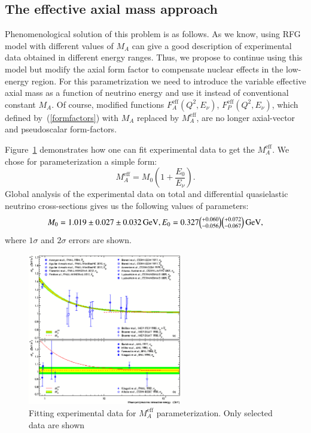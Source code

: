 \subsection{The effective axial mass approach}
Phenomenological solution of this problem is as follows. As we know, using RFG model with different values of $M_{A}$ can give a good description of experimental data obtained in different energy ranges. Thus, we propose to continue using this model but modify the axial form factor to compensate nuclear effects in the low-energy region. For this parametrization we need to introduce the variable effective axial mass as a function of neutrino energy and use it instead of conventional constant $M_{A}$. Of course, modified functions $F_{A}^\mathrm{eff}(Q^{2},E_{\nu})$, $F_{P}^\mathrm{eff}(Q^{2},E_{\nu})$, which defined by~(\ref{formfactors}) with $M_{A}$ replaced by $M_{A}^\mathrm{eff}$, are no longer axial-vector and pseudoscalar form-factors.

Figure~\ref{MA_QES_eff} demonstrates how one can fit experimental data to get the $M_{A}^\mathrm{eff}$. We chose for parameterization a simple form:
\begin{equation}
M_{A}^\mathrm{eff}=M_{0}\left(1+\frac{E_{0}}{E_{\nu}}\right).
\end{equation}
Global analysis of the experimental data on total and differential quasielastic neutrino cross-sections gives us the following values of parameters:
\begin{equation}
M_{0}=1.019\pm0.027\pm0.032\,\mathrm{GeV},E_{0}=0.327\tbinom{+0.060}{-0.056}\tbinom{+0.072}{-0.067}\,\mathrm{GeV},
\end{equation}
where $1\sigma$ and $2\sigma$ errors are shown.

\begin{figure}[htb!]
\begin{center}
\includegraphics[width=0.6\textwidth]{./QES/MA_QES_eff.eps}
\caption{\label{MA_QES_eff}Fitting experimental data for $M_{A}^\mathrm{eff}$ parameterization. Only selected data are shown}
\end{center}
\end{figure}


